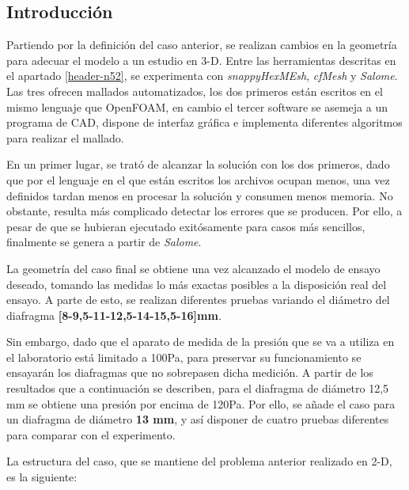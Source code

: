 \subsection{Introducción}\label{header-n2}

Partiendo por la definición del caso anterior, se realizan cambios en la
geometría para adecuar el modelo a un estudio en 3-D. Entre las
herramientas descritas en el apartado \ref{header-n52}, se experimenta con \emph{snappyHexMEsh}, \emph{cfMesh} y
\emph{Salome}. Las tres ofrecen mallados automatizados, los dos primeros
están escritos en el mismo lenguaje que OpenFOAM, en cambio el tercer
software se asemeja a un programa de CAD, dispone de interfaz gráfica e
implementa diferentes algoritmos para realizar el mallado.

En un primer lugar, se trató de alcanzar la solución con los dos
primeros, dado que por el lenguaje en el que están escritos los archivos
ocupan menos, una vez definidos tardan menos en procesar la solución y
consumen menos memoria. No obstante, resulta más complicado detectar los
errores que se producen. Por ello, a pesar de que se hubieran ejecutado
exitósamente para casos más sencillos, finalmente se genera a partir de
\emph{Salome}.

La geometría del caso final se obtiene una vez alcanzado el modelo de
ensayo deseado, tomando las medidas lo más exactas posibles a la
disposición real del ensayo. A parte de esto, se realizan diferentes
pruebas variando el diámetro del diafragma
\textbf{{[}8-9,5-11-12,5-14-15,5-16{]}mm}.

Sin embargo, dado que el aparato de medida de la presión que se va a
utiliza en el laboratorio está limitado a 100Pa, para preservar su
funcionamiento se ensayarán los diafragmas que no sobrepasen dicha
medición. A partir de los resultados que a continuación se describen,
para el diafragma de diámetro 12,5 mm se obtiene una presión por encima
de 120Pa. Por ello, se añade el caso para un diafragma de diámetro
\textbf{13 mm}, y así disponer de cuatro pruebas diferentes para
comparar con el experimento.

La estructura del caso, que se mantiene del problema anterior realizado
en 2-D, es la siguiente:


